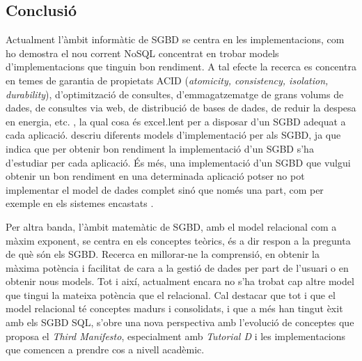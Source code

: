 \subsection{Conclusió}


Actualment l'àmbit informàtic de SGBD se centra en les
implementacions, com ho demostra el nou corrent NoSQL concentrat en
trobar models d'implementacions que tinguin bon rendiment. A tal
efecte la recerca es concentra en temes de garantia de propietats ACID
(\emph{atomicity, consistency, isolation, durability}), d'optimització
de consultes, d'emmagatzematge de grans volums de dades, de consultes
via web, de distribució de bases de dades, de reduir la despesa en
energia, etc. \parencite{stonebraker07,stonebraker10}, la qual cosa és
exce\l.lent per a disposar d'un SGBD adequat a cada aplicació.
\textcite{haerder05:_dbms_archit} descriu diferents models
d'implementació per als SGBD, ja que indica que per obtenir bon
rendiment la implementació d'un SGBD s'ha d'estudiar per cada
aplicació. És més, una implementació d'un SGBD que vulgui obtenir un
bon rendiment en una determinada aplicació potser no pot implementar
el model de dades complet sinó que només una part, com per exemple en
els sistemes
encastats \parencite{saake09:_downs_data_manag_embed_system}.

Per altra banda, l'àmbit matemàtic de SGBD, amb el model relacional
com a màxim exponent, se centra en els conceptes teòrics, és a dir
respon a la pregunta de què són els SGBD. Recerca en millorar-ne la
comprensió, en obtenir la màxima potència i facilitat de cara a la
gestió de dades per part de l'usuari o en obtenir nous models. Tot i
així, actualment encara no s'ha trobat cap altre model que tingui la
mateixa potència que el relacional. Cal destacar que tot i que el
model relacional té conceptes madurs i consolidats, i que a més han
tingut èxit amb els SGBD SQL, s'obre una nova perspectiva amb
l'evolució de conceptes que proposa el \emph{Third Manifesto},
especialment amb \emph{Tutorial D} i les implementacions que comencen a prendre
cos a nivell acadèmic.




















